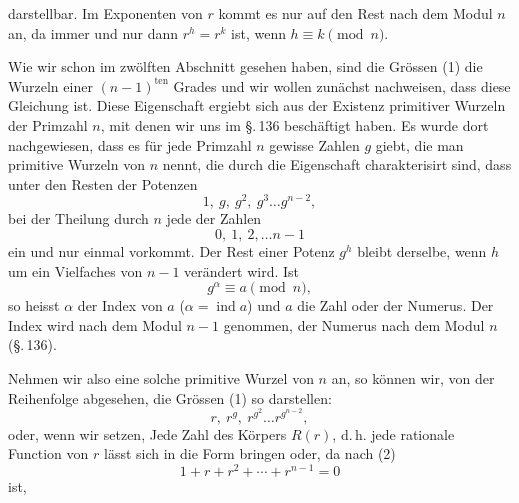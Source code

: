 darstellbar. Im Exponenten von $r$ kommt es nur auf den Rest nach dem Modul $n$ an, da immer und nur dann $r^h = r^k$ ist, wenn $h \equiv k \pmod{n}$.

Wie wir schon im zwölften Abschnitt gesehen haben, sind die Grössen (1) die Wurzeln einer  $(n-1)^{\text{ten}}$ Grades
und wir wollen zunächst nachweisen, dass diese Gleichung  ist. Diese Eigenschaft ergiebt sich aus der Existenz primitiver Wurzeln der Primzahl $n$, mit denen wir uns im \S.\,136 beschäftigt haben. Es wurde dort nachgewiesen, dass es für jede Primzahl $n$ gewisse Zahlen $g$ giebt, die man primitive Wurzeln von $n$ nennt, die durch die Eigenschaft charakterisirt sind, dass unter den Resten der Potenzen
\[
1, \ g, \ g^2, \ g^3 \dots g^{n-2},
\]
bei der Theilung durch $n$ jede der Zahlen
\[
0, \ 1, \ 2, \dots n-1
\]
ein und nur einmal vorkommt. Der Rest einer Potenz $g^h$ bleibt derselbe, wenn $h$ um ein Vielfaches von $n-1$ verändert wird. Ist
\[
g^\alpha \equiv a \pmod{n},
\]
so heisst $\alpha$ der Index von $a$ ($\alpha = \operatorname{ind} a$) und $a$ die Zahl oder der Numerus. Der Index wird nach dem Modul $n-1$ genommen, der Numerus nach dem Modul $n$ (\S.\,136).

Nehmen wir also eine solche primitive Wurzel von $n$ an, so können wir, von der Reihenfolge abgesehen, die Grössen (1) so darstellen:
\[
r, \ r^g, \ r^{g^2} \dots r^{g^{n-2}},
\]
oder, wenn wir
setzen,
Jede Zahl des Körpers $R(r)$, d.\,h. jede rationale Function von $r$ lässt sich in die Form bringen
oder, da nach (2)
\[
1 + r + r^2 + \cdots + r^{n-1} = 0
\]
ist,

